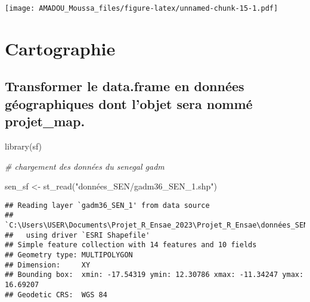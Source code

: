\documentclass[
  14pt,
]{article}
\newenvironment{Shaded}{\begin{snugshade}}{\end{snugshade}}
\newcommand{\CommentTok}[1]{\textcolor[rgb]{0.56,0.35,0.01}{\textit{#1}}}
\newcommand{\FunctionTok}[1]{\textcolor[rgb]{0.00,0.00,0.00}{#1}}
\newcommand{\NormalTok}[1]{#1}
\newcommand{\OtherTok}[1]{\textcolor[rgb]{0.56,0.35,0.01}{#1}}
\newcommand{\StringTok}[1]{\textcolor[rgb]{0.31,0.60,0.02}{#1}}
\begin{document}
\texttt{[image: AMADOU\_Moussa\_files/figure-latex/unnamed-chunk-15-1.pdf]}

\newpage

\hypertarget{cartographie}{%
\section{\texorpdfstring{Cartographie\\
}{Cartographie }}\label{cartographie}}

\hypertarget{transformer-le-data.frame-en-donnuxe9es-guxe9ographiques-dont-lobjet-sera-nommuxe9-projet_map.}{%
\subsection{\texorpdfstring{\textbf{Transformer le data.frame en données
géographiques dont l'objet sera nommé projet\_map.}\\
}{Transformer le data.frame en données géographiques dont l'objet sera nommé projet\_map. }}\label{transformer-le-data.frame-en-donnuxe9es-guxe9ographiques-dont-lobjet-sera-nommuxe9-projet_map.}}

\begin{Shaded}
\begin{Highlighting}[]
\FunctionTok{library}\NormalTok{(sf)}

\CommentTok{\# chargement des données du senegal gadm}

\NormalTok{sen\_sf }\OtherTok{\textless{}{-}} \FunctionTok{st\_read}\NormalTok{(}\StringTok{"données\_SEN/gadm36\_SEN\_1.shp"}\NormalTok{)}
\end{Highlighting}
\end{Shaded}

\begin{verbatim}
## Reading layer `gadm36_SEN_1' from data source 
##   `C:\Users\USER\Documents\Projet_R_Ensae_2023\Projet_R_Ensae\données_SEN\gadm36_SEN_1.shp' 
##   using driver `ESRI Shapefile'
## Simple feature collection with 14 features and 10 fields
## Geometry type: MULTIPOLYGON
## Dimension:     XY
## Bounding box:  xmin: -17.54319 ymin: 12.30786 xmax: -11.34247 ymax: 16.69207
## Geodetic CRS:  WGS 84
\end{verbatim}
\end{document}
